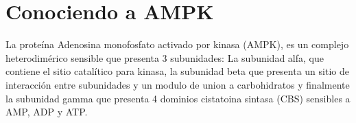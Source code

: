 \chapter{Conociendo a AMPK}
La proteína Adenosina monofosfato activado por kinasa (AMPK), es un complejo heterodimérico sensible que presenta 3 subunidades: La subunidad alfa, que contiene el sitio catalítico para kinasa, la subunidad beta que presenta un sitio de interacción entre subunidades y un modulo de union a carbohidratos y finalmente la subunidad gamma que presenta 4 dominios cistatoina sintasa (CBS) sensibles a AMP, ADP y ATP.
